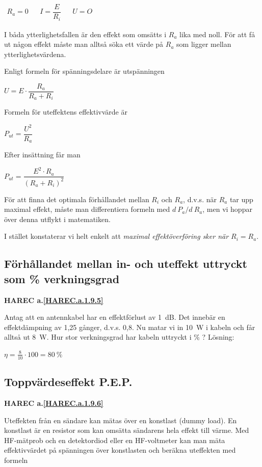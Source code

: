 \(
\begin{array}{lllll}
R_a = 0 & & I = \dfrac{E}{R_i} & & U = O
\end{array}
\)

I båda ytterlighetsfallen är den effekt som omsätts i \(R_a\) lika med noll.
För att få ut någon effekt måste man alltså söka ett värde på \(R_a\) som
ligger mellan ytterlighetsvärdena.

Enligt formeln för spänningsdelare är utspänningen

\(U = E \cdot \dfrac{R_a}{R_a+R_i}\)

Formeln för uteffektens effektivvärde är

\(P_{ut} = \dfrac{U^2}{R_a}\)

Efter insättning får man

\(P_{ut} = \dfrac{E^2 \cdot R_a}{(R_a + R_i)^2}\)

För att finna det optimala förhållandet mellan \(R_i\) och \(R_a\), d.v.s. när
\(R_a\) tar upp maximal effekt, måste man differentiera formeln med \(d\ P_a/d\ R_a\), men vi hoppar över denna utflykt i matematiken.

I stället konstaterar vi helt enkelt att \emph{maximal effektöverföring sker när
\(R_i = R_a\)}.

\subsection{Förhållandet mellan in- och uteffekt uttryckt som \% verkningsgrad}
\textbf{HAREC a.\ref{HAREC.a.1.9.5}\label{myHAREC.a.1.9.5}}

Antag att en antennkabel har en effektförlust av 1~dB. Det innebär en
effektdämpning av 1,25 gånger, d.v.s. 0,8. Nu matar vi in 10~W i kabeln och får
alltså ut 8~W. Hur stor verkningsgrad har kabeln uttryckt i \% ?
Lösning:

\(\eta = \frac{8}{10} \cdot 100 = 80\ \%\)

\subsection{Toppvärdeseffekt P.E.P.}
\textbf{HAREC a.\ref{HAREC.a.1.9.6}\label{myHAREC.a.1.9.6}}

Uteffekten från en sändare kan mätas över en konstlast (dummy load). En
konstlast är en resistor som kan omsätta sändarens hela effekt till värme. Med
HF-mätprob och en detektordiod eller en HF-voltmeter kan man mäta
effektivvärdet på spänningen över konstlasten och beräkna uteffekten med
formeln

